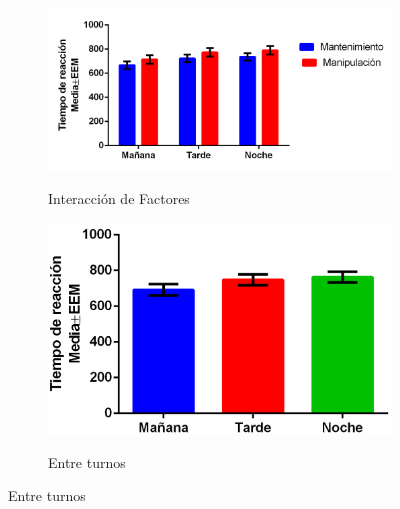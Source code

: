 \documentclass[12pt,letterpaper,final]{article}
\begin{document}
\begin{figure}[h]
 \begin{footnotesize}
  \begin{subfigure}[a]{.4\textwidth}	
	\centering
	\caption{Interacción de Factores}
	\includegraphics[scale=0.6]{graficas/RT_intr.png}
	\label{Sub:rtint}
	\end{subfigure}
    \hfill
    \begin{subfigure}[a]{\textwidth}	
	\centering
	\caption{Entre turnos}
	\includegraphics[scale=0.6]{graficas/RT_Tur.png}
	\label{Sub:rttur}
	\end{subfigure}
	

\end{footnotesize}
\end{figure}
\end{document}
